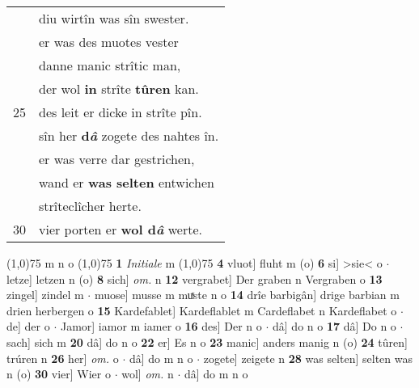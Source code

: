 \documentclass[8pt,a4paper,notitlepage]{article}
\begin{document}
\begin{table}[ht]
\begin{minipage}[t]{0.5\linewidth}
\begin{tabular}{rl}
 & diu wirtîn was sîn swester.\\ 
 & er was des muotes vester\\ 
 & danne manic strîtic man,\\ 
 & der wol \textbf{in} strîte \textbf{tûren} kan.\\ 
25 & des leit er dicke in strîte pîn.\\ 
 & sîn her \textbf{d\textit{â}} zogete des nahtes în.\\ 
 & er was verre dar gestrichen,\\ 
 & wand er \textbf{was selten} entwichen\\ 
 & strîteclîcher herte.\\ 
30 & vier porten er \textbf{wol d\textit{â}} werte.\\ 
\end{tabular}
\scriptsize
\line(1,0){75} \newline
m n o \newline
\line(1,0){75} \newline
\textbf{1} \textit{Initiale} m  \newline
\line(1,0){75} \newline
\textbf{4} vluot] fluht m (o) \textbf{6} si] >sie< o  $\cdot$ letze] letzen n (o) \textbf{8} sich] \textit{om.} n \textbf{12} vergrabet] Der graben n Vergraben o \textbf{13} zingel] zindel m  $\cdot$ muose] musse m muͯste n o \textbf{14} drîe barbigân] drige barbian m drien herbergen o \textbf{15} Kardefablet] Kardeflablet m Cardeflabet n Kardeflabet o  $\cdot$ de] der o  $\cdot$ Jamor] iamor m iamer o \textbf{16} des] Der n o  $\cdot$ dâ] do n o \textbf{17} dâ] Do n o  $\cdot$ sach] sich m \textbf{20} dâ] do n o \textbf{22} er] Es n o \textbf{23} manic] anders manig n (o) \textbf{24} tûren] trúren n \textbf{26} her] \textit{om.} o  $\cdot$ dâ] do m n o  $\cdot$ zogete] zeigete n \textbf{28} was selten] selten was n (o) \textbf{30} vier] Wier o  $\cdot$ wol] \textit{om.} n  $\cdot$ dâ] do m n o \newline
\end{minipage}
\end{table}
\newpage
\end{document}
